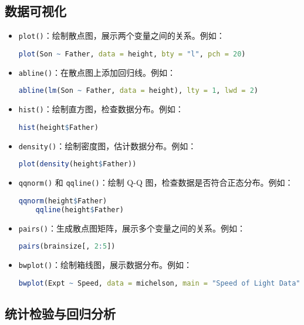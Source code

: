 \documentclass[UTF8]{report}
\theoremstyle{MyLineTheoremStyle} %
\theoremstyle{MyBlockTheoremStyle} %
\theoremstyle{MySubsubsectionStyle} %
\begin{document}
\subsection*{数据可视化}

\begin{itemize}
    \item \texttt{plot()}：绘制散点图，展示两个变量之间的关系。例如：
    \begin{lstlisting}[language=R]
    plot(Son ~ Father, data = height, bty = "l", pch = 20)
    \end{lstlisting}
    \item \texttt{abline()}：在散点图上添加回归线。例如：
    \begin{lstlisting}[language=R]
    abline(lm(Son ~ Father, data = height), lty = 1, lwd = 2)
    \end{lstlisting}
    \item \texttt{hist()}：绘制直方图，检查数据分布。例如：
    \begin{lstlisting}[language=R]
    hist(height$Father)
    \end{lstlisting}
    \item \texttt{density()}：绘制密度图，估计数据分布。例如：
    \begin{lstlisting}[language=R]
    plot(density(height$Father))
    \end{lstlisting}
    \item \texttt{qqnorm()} 和 \texttt{qqline()}：绘制 Q-Q 图，检查数据是否符合正态分布。例如：
    \begin{lstlisting}[language=R]
    qqnorm(height$Father)
    qqline(height$Father)
    \end{lstlisting}
    \item \texttt{pairs()}：生成散点图矩阵，展示多个变量之间的关系。例如：
    \begin{lstlisting}[language=R]
    pairs(brainsize[, 2:5])
    \end{lstlisting}
    \item \texttt{bwplot()}：绘制箱线图，展示数据分布。例如：
    \begin{lstlisting}[language=R]
    bwplot(Expt ~ Speed, data = michelson, main = "Speed of Light Data", ylab = "Experiment No.")
    \end{lstlisting}
\end{itemize}

\subsection*{统计检验与回归分析}
\end{document}
